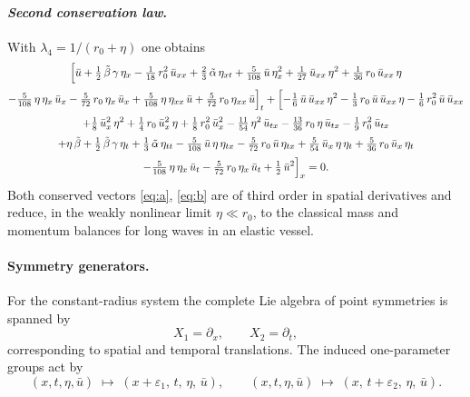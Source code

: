 \documentclass[alpha-refs, 12pt]{wiley-article}
\newcommand{\eps}{\varepsilon}
\begin{document}
\paragraph{\textit{Second conservation law}.} With $\displaystyle\lambda_{4}=1/(r_{0}+\eta)$ one obtains
\begin{multline}\label{eq:b}
  \Bigl[
        \bar{u}
        +\tfrac12\,\tilde{\beta}\,\gamma\,\eta_{x}
        -\tfrac1{18}\,r_{0}^{2}\,\bar{u}_{xx}
        +\tfrac23\,\tilde{\alpha}\,\eta_{xt}
        +\tfrac{5}{108}\,\bar{u}\,\eta_{x}^{2}
        +\tfrac1{27}\,\bar{u}_{xx}\,\eta^{2}
        +\tfrac1{36}\,r_{0}\,\bar{u}_{xx}\,\eta
        \\[2pt]
        -\tfrac{5}{108}\,\eta\,\eta_{x}\,\bar{u}_{x}
        -\tfrac{5}{72}\,r_{0}\,\eta_{x}\,\bar{u}_{x}
        +\tfrac{5}{108}\,\eta\,\eta_{xx}\,\bar{u}
        +\tfrac{5}{72}\,r_{0}\,\eta_{xx}\,\bar{u}
  \Bigr]_{t}
  +\Bigl[
        -\tfrac16\,\bar{u}\,\bar{u}_{xx}\,\eta^{2}
        -\tfrac13\,r_{0}\,\bar{u}\,\bar{u}_{xx}\,\eta
        -\tfrac16\,r_{0}^{2}\,\bar{u}\,\bar{u}_{xx}
        \\[2pt]
        +\tfrac18\,\bar{u}_{x}^{2}\,\eta^{2}
        +\tfrac14\,r_{0}\,\bar{u}_{x}^{2}\,\eta
        +\tfrac18\,r_{0}^{2}\,\bar{u}_{x}^{2}
        -\tfrac{11}{54}\,\eta^{2}\,\bar{u}_{tx}
        -\tfrac{13}{36}\,r_{0}\,\eta\,\bar{u}_{tx}
        -\tfrac19\,r_{0}^{2}\,\bar{u}_{tx}
        \\[2pt]
        +\eta\,\tilde{\beta}
        +\tfrac12\,\tilde{\beta}\,\gamma\,\eta_{t}
        +\tfrac13\,\tilde{\alpha}\,\eta_{tt}
        -\tfrac{5}{108}\,\bar{u}\,\eta\,\eta_{tx}
        -\tfrac{5}{72}\,r_{0}\,\bar{u}\,\eta_{tx}
        +\tfrac{5}{54}\,\bar{u}_{x}\,\eta\,\eta_{t}
        +\tfrac{5}{36}\,r_{0}\,\bar{u}_{x}\,\eta_{t}
        \\[2pt]
        -\tfrac{5}{108}\,\eta\,\eta_{x}\,\bar{u}_{t}
        -\tfrac{5}{72}\,r_{0}\,\eta_{x}\,\bar{u}_{t}
        +\tfrac12\,\bar{u}^{2}
  \Bigr]_{x}=0.
\end{multline}
Both conserved vectors \eqref{eq:a}, \eqref{eq:b} are of third order in spatial derivatives and reduce, in the weakly nonlinear limit $\eta \ll r_{0}$, to the classical mass and momentum balances for long waves in an elastic vessel.

\paragraph{Symmetry generators.} For the constant-radius system the complete Lie algebra of point symmetries is spanned by
\[
  X_{1}=\partial_{x},
  \qquad
  X_{2}=\partial_{t},
\]
corresponding to spatial and temporal translations. The induced one-parameter groups act by
\[
  (x,t,\eta,\bar{u})\;\mapsto\;
  (x+\eps_{1},\,t,\,\eta,\,\bar{u}),
  \qquad
  (x,t,\eta,\bar{u})\;\mapsto\;
  (x,\,t+\eps_{2},\,\eta,\,\bar{u}).
\]
\end{document}
